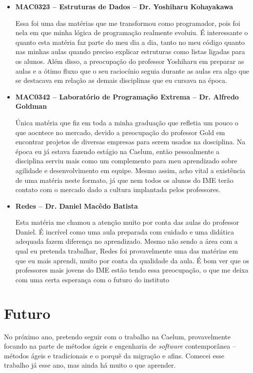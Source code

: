 \documentclass[titlepage,a4paper]{article}
\newcommand{\software}{\textit{software}}
\begin{document}
\begin{itemize}
	\item{\textbf{MAC0323 -- Estruturas de Dados -- Dr. Yoshiharu Kohayakawa} 

		Essa foi uma das matérias que me transformou como programador, pois foi nela em que minha lógica de programação realmente evoluiu. É interessante o quanto esta matéria faz parte do meu dia a dia, tanto no meu código quanto nas minhas aulas quando preciso explicar estruturas como listas ligadas para os alunos. Além disso, a preocupação do professor Yoshiharu em preparar as aulas e a 
		ótimo fluxo que o seu raciocínio seguia durante as aulas era algo que se destacava em relação as demais disciplinas que eu cursava na época.}
	\item{\textbf{MAC0342 -- Laboratório de Programação Extrema -- Dr. Alfredo Goldman}

		Única matéria que fiz em toda a minha graduação que refletia um pouco o que aocntece no mercado,  devido a preocupação do professor Gold em encontrar projetos de diversas empresas para serem usados na dosciplina. Na época eu já estava fazendo estágio na Caelum, então pessoalmente a disciplina serviu mais como um complemento para meu aprendizado sobre agilidade e desenvolvimento em equipe. Mesmo assim, acho vital a existência de uma matéria neste formato, já que nem todos os alunos do IME terão contato com o mercado dado a cultura implantada pelos professores.}
	\item{\textbf{Redes -- Dr. Daniel Macêdo Batista}

		Esta matéria me chamou a atenção muito por conta das aulas do professor Daniel. É incrível como uma aula preparada com cuidado e uma didática adequada fazem diferença no aprendizado. Mesmo não sendo a área com a qual eu pretenda trabalhar, Redes foi provavelmente uma das matérias em que eu mais aprendi, muito por conta da qualidade da aula. É bom ver que os professores mais jovens do IME estão tendo essa preocupação, o que me deixa com uma certa esperança com o futuro do instituto}
\end{itemize}

\section{Futuro}

No próximo ano, pretendo seguir com o trabalho na Caelum, provavelmente focando na parte de métodos ágeis e engenharia de \software{} contemporânea -- métodos ágeis e tradicionais e o porquê da migração e afins. Comecei esse trabalho já esse ano, mas ainda há muito o que aprender.
\end{document}
